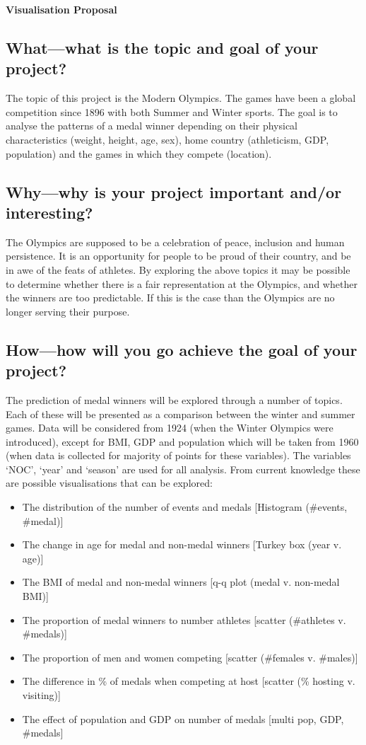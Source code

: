 \documentclass[a4 paper, 12pt]{memoir}
\begin{document}
\begin{center}
    \Huge
\textbf{Visualisation Proposal}
\end{center}

\subsection*{What—what is the topic and goal of your project? }
The topic of this project is the Modern Olympics. The games have been a global competition since 1896 with both Summer and Winter sports. The goal is to analyse the patterns of a medal winner depending on their physical characteristics (weight, height, age, sex), home country (athleticism, GDP, population) and the games in which they compete (location).

\subsection*{Why—why is your project important and/or interesting? }
The Olympics are supposed to be a celebration of peace, inclusion and human persistence. It is an opportunity for people to be proud of their country, and be in awe of the feats of athletes. By exploring the above topics it may be possible to determine whether there is a fair representation at the Olympics, and whether the winners are too predictable. If this is the case than the Olympics are no longer serving their purpose.

\subsection*{How—how will you go achieve the goal of your project?}
The prediction of medal winners will be explored through a number of topics. Each of these will be presented as a comparison between the winter and summer games. Data will be considered from 1924 (when the Winter Olympics were introduced), except for BMI, GDP and population which will be taken from 1960 (when data is collected for majority of points for these variables). The variables ‘NOC’, ‘year’ and ‘season’ are used for all analysis. From current knowledge these are possible visualisations that can be explored:
    \begin{itemize}
        \item The distribution of the number of events and medals [Histogram (\#events, \#medal)]
        \item The change in age for medal and non-medal winners [Turkey box (year v. age)]
        \item The BMI of medal and non-medal winners [q-q plot (medal v. non-medal BMI)]
        \item The proportion of medal winners to number athletes [scatter (\#athletes v. \#medals)]
        \item The proportion of men and women competing [scatter (\#females v. \#males)]
        \item The difference in \% of medals when competing at host [scatter (\% hosting v. visiting)]
        \item The effect of population and GDP on number of medals [multi \- pop, GDP, \#medals]
    \end{itemize}
\end{document}
